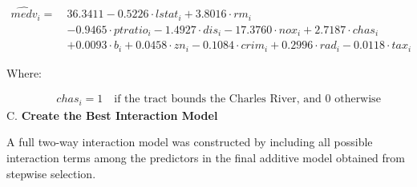 \documentclass[
]{article}
\begin{document}
\[
\begin{aligned}
\hat{medv}_i =\ & 36.3411 - 0.5226 \cdot lstat_i + 3.8016 \cdot rm_i \\
& - 0.9465 \cdot ptratio_i - 1.4927 \cdot dis_i - 17.3760 \cdot nox_i + 2.7187 \cdot chas_i \\
& + 0.0093 \cdot b_i + 0.0458 \cdot zn_i - 0.1084 \cdot crim_i + 0.2996 \cdot rad_i - 0.0118 \cdot tax_i
\end{aligned}
\]

Where:

\[
\begin{aligned}
&\quad chas_i = 1 \quad \text{if the tract bounds the Charles River, and 0 otherwise}
\end{aligned}
\] C. \textbf{Create the Best Interaction Model}

A full two-way interaction model was constructed by including all
possible interaction terms among the predictors in the final additive
model obtained from stepwise selection.
\end{document}
